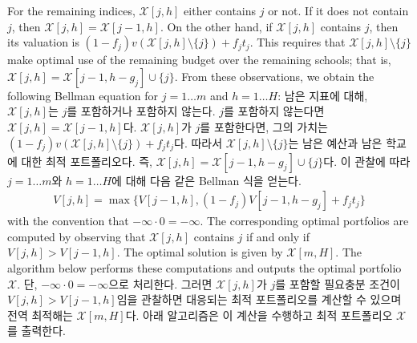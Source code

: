 \documentclass[11pt]{article} %
\theoremstyle{definition}
\theoremstyle{definition}
\begin{document}
\ifen
For the remaining indices, $\mathcal{X}[j, h]$ either contains $j$ or not. If it does not contain $j$, then $\mathcal{X}[j, h] = \mathcal{X}[j-1, h]$. On the other hand, if  $\mathcal{X}[j, h]$ contains $j$, then its valuation is $(1 - f_j) v(\mathcal{X}[j, h]\setminus \{j\}) + f_j t_j$. This requires that $\mathcal{X}[j, h]\setminus \{j\}$ make optimal use of the remaining budget over the remaining schools; that is, $\mathcal{X}[j, h] = \mathcal{X}[j-1, h - g_j] \cup\{j\}$. From these observations, we obtain the following Bellman equation for $ j = 1\dots m$ and $h = 1\dots H$:
\else
남은 지표에 대해, $\mathcal{X}[j, h]$는 $j$를 포함하거나 포함하지 않는다. $j$를 포함하지 않는다면 $\mathcal{X}[j, h] = \mathcal{X}[j-1, h]$다. $\mathcal{X}[j, h]$가 $j$를 포함한다면, 그의 가치는  $(1 - f_j) v(\mathcal{X}[j, h]\setminus \{j\}) + f_j t_j$다. 따라서 $\mathcal{X}[j, h]\setminus \{j\}$는 남은 예산과 남은 학교에 대한 최적 포트폴리오다. 즉,  $\mathcal{X}[j, h] = \mathcal{X}[j-1, h - g_j] \cup\{j\}$다. 이 관찰에 따라 $ j = 1\dots m$와 $h = 1\dots H$에 대해 다음 같은 Bellman 식을 얻는다.
\fi
\begin{align}
V[j, h] = \max\bigl\{ V[j-1, h], (1 - f_j) V[j-1, h-g_j] + f_j t_j \bigr\}
\end{align}
\ifen 
with the convention that $ -\infty \cdot 0 = -\infty$. The corresponding optimal portfolios are computed by observing that $\mathcal{X}[j, h]$ contains $j$ if and only if $V[j, h]> V[j-1, h]$. The optimal solution is given by $\mathcal{X}[m, H]$. The algorithm below performs these computations and outputs the optimal portfolio $\mathcal{X}$. 
\else
단, $ -\infty \cdot 0 = -\infty$으로 처리한다. 그러면 $\mathcal{X}[j, h]$가  $j$를 포함할 필요충분 조건이 $V[j, h]> V[j-1, h]$임을 관찰하면 대응되는 최적 포트폴리오를 계산할 수 있으며 전역 최적해는 $\mathcal{X}[m, H]$다. 아래 알고리즘은 이 계산을 수행하고 최적 포트폴리오 $\mathcal{X}$를 출력한다.
\fi
\end{document}
